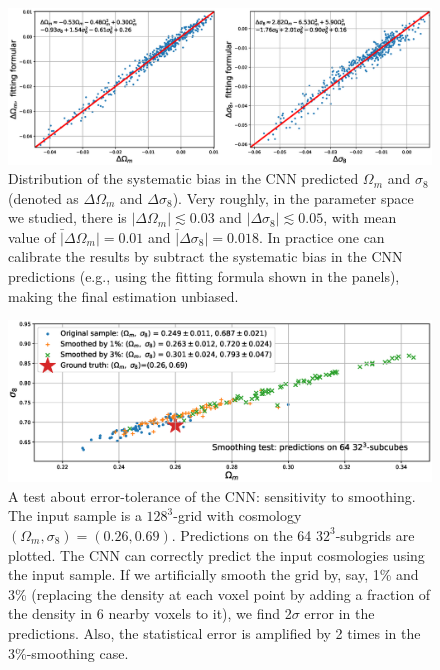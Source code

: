 \documentclass[twocolumn]{aastex61}
\begin{document}
\begin{figure}
   \centering
    \includegraphics[width=16cm]{bias.eps}
   \caption{\label{bias}
   Distribution of the systematic bias in the CNN predicted $\Omega_m$ and $\sigma_8$ (denoted as $\Delta \Omega_m$ and $\Delta \sigma_8$).
   Very roughly, in the parameter space we studied, 
    there is $|\Delta \Omega_m| \lesssim 0.03$ and $|\Delta \sigma_8| \lesssim 0.05$,
    with mean value of $\bar|\Delta \Omega_m|=0.01$ and $\bar|\Delta \sigma_8|=0.018$.
   In practice one can calibrate the results by subtract the systematic bias in the CNN predictions (e.g., using the fitting formula shown in the panels), 
   making the final estimation unbiased.  
   }
\end{figure}

\begin{figure}
   \centering
    \includegraphics[width=16cm]{test_smooth.eps}
   \caption{\label{test_smooth}
   A test about error-tolerance of the CNN: sensitivity to smoothing.
   The input sample is a $128^3$-grid with cosmology $(\Omega_m, \sigma_8)=(0.26,0.69)$.
   Predictions on the 64 $32^3$-subgrids are plotted.
   The CNN can correctly predict the input cosmologies using the input sample.
   If we artificially smooth the grid by, say, 1\% and 3\% 
    (replacing the density at each voxel point by adding a fraction of the density in 6 nearby voxels to it),
    we find 2$\sigma$ error in the predictions.
   Also, the statistical error is amplified by 2 times in the 3\%-smoothing case.
   }
\end{figure}
\end{document}
